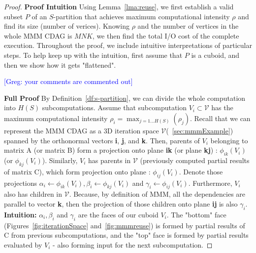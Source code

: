 \documentclass[sigplan,review,anonymous]{acmart}\settopmatter{printfolios=true,printccs=false,printacmref=false}
\newcommand\greg[1]{\textcolor{blue}{[Greg: #1]}}
\newcommand\mac[1]{\textcolor{red}{[Mac: #1]}}
\newcommand{\macb}[1]{\textbf{\textsf{#1}}}
\begin{document}
\begin{proof}

\macb{Proof Intuition}
%
Using Lemma~\ref{lma:reuse}, we first establish a valid subset $P$ of an 
$S$-partition that achieves maximum computational intensity $\rho$ and find its 
size (number of verices). Knowing $\rho$ and the number of vertices in the 
whole MMM CDAG is $MNK$, we then find the total I/O cost of the complete 
execution. Throughout the proof, we include intuitive interpretations of 
particular steps. To help keep up with the intuition, first assume that $P$ is 
a cuboid, and then we show how it gets "flattened".

\greg{your comments are commented out}
%  

\macb{Full Proof}
%
By Definition~\ref{df:s-partition}, we can divide the whole computation into 
$H(S)$ subcomputations. Assume that subcomputation $V_i \subset \mathcal{V}$ 
has 
the maximum 
computational intensity $\rho_i = \max_{j = 1 \dots H(S)}(\rho_j)$. Recall that 
we can represent the 
MMM CDAG as a 3D iteration 
space $\mathcal{V}$(~\cref{sec:mmmExample}) spanned by the orthonormal vectors 
\textbf{i}, 
\textbf{j}, and \textbf{k}. Then, parents of $V_i$  
belonging to matrix A (or matrix B) form a projection onto plane \textbf{ik} 
(or plane 
\textbf{kj}) : $\phi_{ik}(V_i)$ (or $\phi_{kj}(V_i)$). Similarly, $V_i$ has 
parents 
in  
$\mathcal{V}$ (previously computed partial results of matrix C), which form 
projection onto plane : $\phi_{ij}(V_i)$. Denote those projections 
$\alpha_i \gets \phi_{ik}(V_i), \beta_i \gets \phi_{kj}(V_i)$ and $\gamma_i 
\gets 
\phi_{ij}(V_i)$. Furthermore, $V_i$ also has children in $\mathcal{V}$. 
Because, by 
definition of MMM, all the dependencies are parallel to vector \textbf{k}, then 
the 
projection of those children onto plane \textbf{ij} is also $\gamma_i$.\\
\textbf{Intuition:} $\alpha_i, \beta_i$ and $\gamma_i$ are the faces of our 
cuboid 
$V_i$. The "bottom" face (Figures~\ref{fig:iterationSpace} 
and~\ref{fig:mmmreuse}) is formed by partial results of C from previous 
subcomputations, and the "top" face is formed by partial results evaluated by 
$V_i$ - also forming input for the next subcomputation.


\end{proof}
\end{document}
